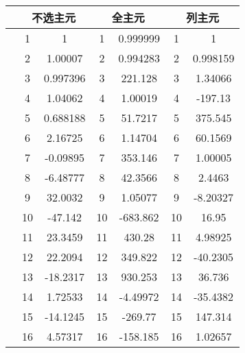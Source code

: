 \documentclass{article}
\begin{document}
\begin{longtable}[c]{ccccccc}
	\toprule
	& \multicolumn{2}{c}{不选主元}          & \multicolumn{2}{c}{全主元}           & \multicolumn{2}{c}{列主元}           \\
	\endfirsthead
	\endhead
	\midrule
	& 1  & 1                            & 1  & 0.999999                     & 1  & 1                            \\
	& 2  & 1.00007                      & 2  & 0.994283                     & 2  & 0.998159                     \\
	& 3  & 0.997396                     & 3  & 221.128                      & 3  & 1.34066                      \\
	& 4  & 1.04062                      & 4  & 1.00019                      & 4  & -197.13                      \\
	& 5  & 0.688188                     & 5  & 51.7217                      & 5  & 375.545                      \\
	& 6  & 2.16725                      & 6  & 1.14704                      & 6  & 60.1569                      \\
	& 7  & -0.09895                     & 7  & 353.146                      & 7  & 1.00005                      \\
	& 8  & -6.48777                     & 8  & 42.3566                      & 8  & 2.4463                       \\
	& 9  & 32.0032                      & 9  & 1.05077                      & 9  & -8.20327                     \\
	& 10 & -47.142                      & 10 & -683.862                     & 10 & 16.95                        \\
	& 11 & 23.3459                      & 11 & 430.28                       & 11 & 4.98925                      \\
	& 12 & 22.2094                      & 12 & 349.822                      & 12 & -40.2305                     \\
	& 13 & -18.2317                     & 13 & 930.253                      & 13 & 36.736                       \\
	& 14 & 1.72533                      & 14 & -4.49972                     & 14 & -35.4382                     \\
	& 15 & -14.1245                     & 15 & -269.77                      & 15 & 147.314                      \\
	& 16 & 4.57317                      & 16 & -158.185                     & 16 & 1.02657                      \\

\end{longtable}
\end{document}
